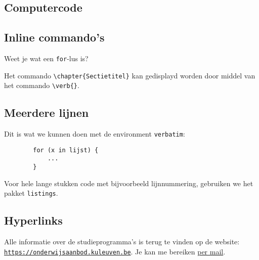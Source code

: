 \documentclass{book}
\begin{document}
	\subsection{Computercode}
	
	\subsection{Inline commando's}
	
	Weet je wat een \texttt{for}-lus is?
	
	Het commando \verb|\chapter{Sectietitel}| kan gedisplayd worden door middel van het commando \verb|\verb{}|.
	
	\subsection{Meerdere lijnen}
	
	Dit is wat we kunnen doen met de environment \texttt{verbatim}:
	
	\begin{verbatim}
		for (x in lijst) {
			...
		}
	\end{verbatim}
	
	Voor hele lange stukken code met bijvoorbeeld lijnnummering, gebruiken we het pakket \texttt{listings}.
	
	\subsection{Hyperlinks}
	
	Alle informatie over de studieprogramma's is terug te vinden op de website: \href{https://onderwijsaanbod.kuleuven.be}{\texttt{https://onderwijsaanbod.kuleuven.be}}. Je kan me bereiken  \href{mailto:vincent.vanschependom@student.kuleuven.be}{per mail}.
	
\end{document}
